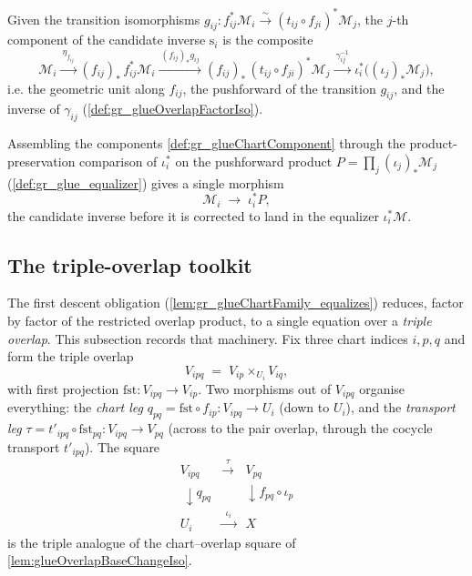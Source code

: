 \begin{definition}
  \label{def:gr_glueChartComponent}
  Given the transition isomorphisms \(g_{ij} : f_{ij}^{*}\mathcal{M}_i \xrightarrow{\sim}
  (t_{ij}\circ f_{ji})^{*}\mathcal{M}_j\), the \(j\)-th component of the candidate
  inverse \(\mathrm{s}_i\) is the composite
  \[
    \mathcal{M}_i
      \xrightarrow{\ \eta_{f_{ij}}\ }
    (f_{ij})_{*}\,f_{ij}^{*}\mathcal{M}_i
      \xrightarrow{\ (f_{ij})_{*}g_{ij}\ }
    (f_{ij})_{*}\,(t_{ij}\circ f_{ji})^{*}\mathcal{M}_j
      \xrightarrow{\ \gamma_{ij}^{-1}\ }
    \iota_i^{*}\bigl((\iota_j)_{*}\mathcal{M}_j\bigr),
  \]
  i.e. the geometric unit along \(f_{ij}\), the pushforward of the transition
  \(g_{ij}\), and the inverse of \(\gamma_{ij}\) (\cref{def:gr_glueOverlapFactorIso}).
\end{definition}

\begin{definition}
  \label{def:gr_glueChartFamily}
  Assembling the components \cref{def:gr_glueChartComponent} through the
  product-preservation comparison of \(\iota_i^{*}\) on the pushforward product
  \(P = \prod_j (\iota_j)_{*}\mathcal{M}_j\) (\cref{def:gr_glue_equalizer}) gives a
  single morphism
  \[
    \mathcal{M}_i \;\longrightarrow\; \iota_i^{*}P,
  \]
  the candidate inverse before it is corrected to land in the equalizer
  \(\iota_i^{*}\mathcal{M}\).
\end{definition}

\subsection{The triple-overlap toolkit}

The first descent obligation (\cref{lem:gr_glueChartFamily_equalizes}) reduces, factor
by factor of the restricted overlap product, to a single equation over a \emph{triple
overlap}. This subsection records that machinery. Fix three chart indices \(i, p, q\)
and form the triple overlap
\[
  V_{ipq} \;=\; V_{ip} \times_{U_i} V_{iq},
\]
with first projection \(\mathrm{fst} : V_{ipq} \to V_{ip}\). Two morphisms out of
\(V_{ipq}\) organise everything: the \emph{chart leg}
\(q_{pq} = \mathrm{fst}\circ f_{ip} : V_{ipq} \to U_i\) (down to \(U_i\)), and the
\emph{transport leg} \(\tau = t'_{ipq}\circ \mathrm{fst}_{pq} : V_{ipq} \to V_{pq}\)
(across to the pair overlap, through the cocycle transport \(t'_{ipq}\)). The square
\[
  \begin{array}{ccc}
    V_{ipq} & \xrightarrow{\ \ \tau\ \ } & V_{pq} \\
    \ \downarrow{\scriptstyle q_{pq}} & & \downarrow{\scriptstyle f_{pq}\circ \iota_p} \\
    U_i & \xrightarrow{\ \ \iota_i\ \ } & X
  \end{array}
\]
is the triple analogue of the chart--overlap square of \cref{lem:glueOverlapBaseChangeIso}.

